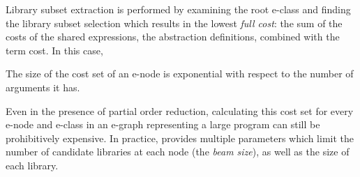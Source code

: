 Library subset extraction is performed by examining the root
e-class and finding the library subset selection which results
in the lowest \emph{full cost}: the sum of the costs of the
shared expressions, the abstraction definitions, combined with
the term cost.
%
In this case, 

%
The size of the cost set of an e-node is exponential with respect
to the number of arguments it has.

%
Even in the presence of partial order reduction, calculating this cost
set for every e-node and e-class in an e-graph representing a large
program can still be prohibitively expensive.
%
In practice, \tool provides multiple parameters which limit the number
of candidate libraries at each node (the \emph{beam size}),
as well as the size of each library.
